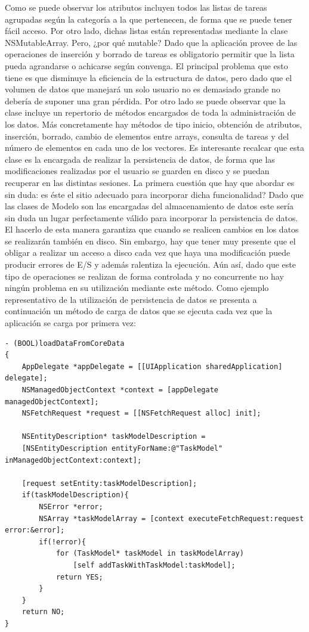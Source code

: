 \documentclass[parskip=half*]{scrartcl}
\begin{document}
Como se puede observar los atributos incluyen todos las listas de tareas agrupadas seg\'un la categor\'ia a la que pertenecen, de forma que se puede tener f\'acil acceso. Por otro lado, dichas listas est\'an representadas mediante la clase NSMutableArray. Pero, ¿por qu\'e mutable? Dado que la aplicaci\'on provee de las operaciones de inserci\'on y borrado de tareas es obligatorio permitir que la lista pueda agrandarse o achicarse seg\'un convenga. El principal problema que esto tiene es que disminuye la eficiencia de la estructura de datos, pero dado que el volumen de datos que manejar\'a un solo usuario no es demasiado grande no deber\'ia de suponer una gran p\'erdida.
Por otro lado se puede observar que la clase incluye un repertorio de m\'etodos encargados de toda la administraci\'on de los datos. M\'as concretamente hay m\'etodos de tipo inicio, obtenci\'on de atributos, inserci\'on, borrado, cambio de elementos entre arrays, consulta de tareas y del n\'umero de elementos en cada uno de los vectores.
Es interesante recalcar que esta clase es la encargada de realizar la persistencia de datos, de forma que las modificaciones realizadas por el usuario se guarden en disco y se puedan recuperar en las distintas sesiones. La primera cuesti\'on que hay que abordar es sin duda: \textquestiondown es \'este el sitio adecuado para incorporar dicha funcionalidad? Dado que las clases de Modelo son las encargadas del almacenamiento de datos este ser\'ia sin duda un lugar perfectamente v\'alido para incorporar la persistencia de datos. El hacerlo de esta manera garantiza que cuando se realicen cambios en los datos se realizar\'an tambi\'en en disco. Sin embargo, hay que tener muy presente que el obligar a realizar un acceso a disco cada vez que haya una modificaci\'on puede producir errores de E/S y adem\'as ralentiza la ejecuci\'on. A\'un as\'i, dado que este tipo de operaciones se realizan de forma controlada y no concurrente no hay ning\'un problema en su utilizaci\'on mediante este m\'etodo.
Como ejemplo representativo de la utilizaci\'on de persistencia de datos se presenta a continuaci\'on un m\'etodo de carga de datos que se ejecuta cada vez que la aplicaci\'on se carga por primera vez:

\begin{lstlisting}
- (BOOL)loadDataFromCoreData
{
    AppDelegate *appDelegate = [[UIApplication sharedApplication] delegate];
    NSManagedObjectContext *context = [appDelegate managedObjectContext];
    NSFetchRequest *request = [[NSFetchRequest alloc] init];
    
    NSEntityDescription* taskModelDescription = 
    [NSEntityDescription entityForName:@"TaskModel" inManagedObjectContext:context];

    [request setEntity:taskModelDescription];
    if(taskModelDescription){
        NSError *error;
        NSArray *taskModelArray = [context executeFetchRequest:request error:&error];
        if(!error){
            for (TaskModel* taskModel in taskModelArray)
                [self addTaskWithTaskModel:taskModel];
            return YES;
        }
    }
    return NO;
}
\end{lstlisting}
\end{document}
